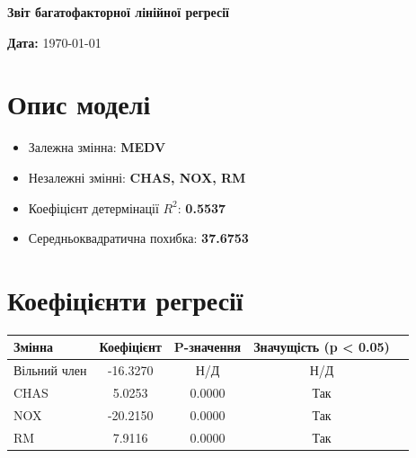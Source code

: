 \documentclass{article}
\begin{document}
    \begin{center}
    \Large\textbf{Звіт багатофакторної лінійної регресії}
    \end{center}

    \vspace{1cm}

    \textbf{Дата:} \today

    \vspace{0.5cm}

    \section{Опис моделі}

    \begin{itemize}
        \item Залежна змінна: \textbf{MEDV}
        \item Незалежні змінні: \textbf{CHAS, NOX, RM}
        \item Коефіцієнт детермінації $R^2$: \textbf{0.5537}
        \item Середньоквадратична похибка: \textbf{37.6753}
    \end{itemize}

    \vspace{0.5cm}

    \section{Коефіцієнти регресії}

    \begin{center}
    \begin{tabular}{lcccc}
    \toprule
    \textbf{Змінна} & \textbf{Коефіцієнт} & \textbf{P-значення} & \textbf{Значущість (p < 0.05)} \\
    \midrule
    Вільний член & -16.3270 & Н/Д & Н/Д \\
    CHAS & 5.0253 & 0.0000 & Так \\
NOX & -20.2150 & 0.0000 & Так \\
RM & 7.9116 & 0.0000 & Так \\

    \bottomrule
    \end{tabular}
    \end{center}

    \vspace{1cm}
    
\end{document}
